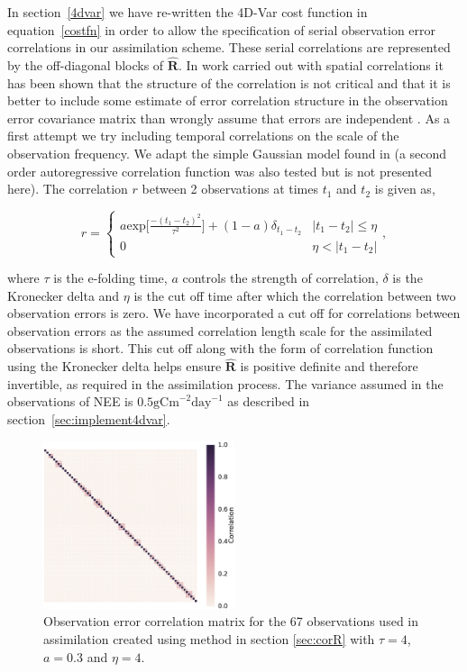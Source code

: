 \documentclass[review]{elsarticle}
\begin{document}
In section~\ref{4dvar} we have re-written the 4D-Var cost function in equation~\eqref{costfn} in order to allow the specification of serial observation error correlations in our assimilation scheme. These serial correlations are represented by the off-diagonal blocks of $\hat{\mathbf{R}}$. In work carried out with spatial correlations it has been shown that the structure of the correlation is not critical and that it is better to include some estimate of error correlation structure in the observation error covariance matrix than wrongly assume that errors are independent \citep{Stewart2013, Healy2005}. As a first attempt we try including temporal correlations on the scale of the observation frequency. We adapt the simple Gaussian model found in \citet{jarvinen1999variational} (a second order autoregressive correlation function was also tested but is not presented here). The correlation $r$ between 2 observations at times $t_1$ and $t_2$ is given as,
\begin{linenomath}
\begin{equation}
r =
\begin{cases} 
      a \text{exp} \bigg[ \frac{-(t_1 - t_2)^2}{\tau^2} \bigg] + (1- a)\delta_{t_1 - t_2} & |t_1 - t_2| \leq \eta \\
      0 & \eta < |t_1 - t_2| 
   \end{cases}
   , \label{eqn:corr_fn}
\end{equation}
\end{linenomath}
where $\tau$ is the e-folding time, $a$ controls the strength of correlation, $\delta$ is the Kronecker delta and $\eta$ is the cut off time after which the correlation between two observation errors is zero. We have incorporated a cut off for correlations between observation errors as the assumed correlation length scale for the assimilated observations is short. This cut off along with the form of correlation function using the Kronecker delta helps ensure $\hat{\mathbf{R}}$ is positive definite and therefore invertible, as required in the assimilation process. The variance assumed in the observations of NEE is $0.5\text{gCm}^{-2}\text{day}^{-1}$ as described in section~\ref{sec:implement4dvar}.

\begin{figure}[ht]
    \centering
    \includegraphics[width=0.5\textwidth]{rcorcor.eps}
    \caption{Observation error correlation matrix for the 67 observations used in assimilation created using method in section \ref{sec:corR} with $\tau = 4$, $a=0.3$ and $\eta=4$.}
    \label{fig:Rcorr}
\end{figure}
\end{document}
